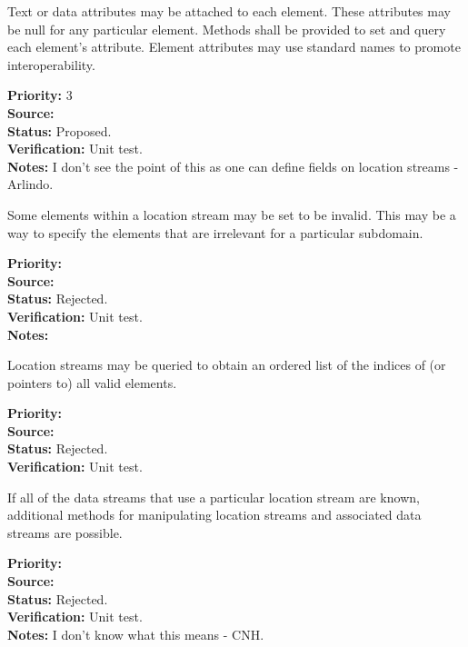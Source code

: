 Text or data attributes may be attached to each element.  These
attributes may be null for any particular element.  Methods shall be provided to set
and query each element's attribute.  Element attributes may use standard names to
promote interoperability.
\begin{reqlist}
{\bf Priority:} 3\\
{\bf Source:} \\
{\bf Status:} Proposed. \\
{\bf Verification:} Unit test. \\
{\bf Notes:} I don't see the point of this as one can define fields on location streams - Arlindo.
\end{reqlist}


Some elements within a location stream may be set to be invalid.  This may be a way
to specify the elements that are irrelevant for a particular subdomain.

\begin{reqlist}
{\bf Priority:} \\
{\bf Source:} \\
{\bf Status:} Rejected. \\
{\bf Verification:} Unit test. \\
{\bf Notes:} 
\end{reqlist}


Location streams may be queried to obtain an ordered list of the indices of (or
pointers to) all valid elements.

\begin{reqlist}
{\bf Priority:} \\
{\bf Source:} \\
{\bf Status:} Rejected. \\
{\bf Verification:} Unit test. 
\end{reqlist}

If all of the data streams that use a particular location stream are known,
additional methods for manipulating location streams and associated data streams are
possible.
\begin{reqlist}
{\bf Priority:} \\
{\bf Source:} \\
{\bf Status:} Rejected. \\
{\bf Verification:} Unit test. \\
{\bf Notes:} I don't know what this means - CNH.
\end{reqlist}

